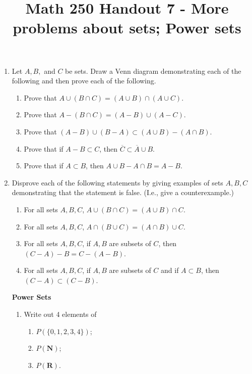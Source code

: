 \documentclass[12pt, reqno]{amsart}
\begin{document}
\title[Math 250 Handout 7 - More problems about sets; Power sets]{Math 250 Handout 7 - More problems about sets; Power sets}\maketitle


\begin{enumerate}
\item Let $A,B,$ and $C$ be sets. Draw a Venn diagram demonstrating each of the following and then prove each of the following.



\begin{enumerate}
\item Prove that $A \cup (B \cap C) = (A\cup B) \cap (A \cup C)$.
\item Prove that $A - (B \cap C) = (A - B) \cup (A - C)$.
\item Prove that $(A - B) \cup (B-A) \subset (A \cup B) - (A \cap B)$.
\item Prove that if $A - B \subset C$, then $ \overline{C} \subset \overline{A} \cup B$.
\item Prove that if $A \subset B$, then $A\cup B - A \cap B = A - B$.
\end{enumerate}
\vspace{1cm}

\item Disprove each of the following statements by giving examples of sets
$A,B,C$ demonstrating that the statement is false. (I.e., give a counterexample.)
\begin{enumerate}
\item For all sets $A,B,C$, $A \cup (B \cap C) = (A\cup B) \cap C$.
\item For all sets $A,B,C$, $A \cap (B \cup C) = (A\cap B) \cup C$.
\item For all sets $A,B,C$, if $A,B$ are subsets of $C$, then $(C-A) - B = C-(A-B)$.
\item For all sets $A,B,C$, if $A,B$ are subsets of $C$ and if $A \subset B$, then $(C-A) \subset (C- B)$.
\end{enumerate}

\newpage
\textbf{Power Sets}\\

\begin{enumerate}
\item Write out 4 elements of
 \begin{enumerate}
 \item $P(\{0,1,2,3,4\})$;
 \item $P(\mathbf{N})$;
 \item $P(\mathbf{R})$.\\
 \end{enumerate}
 \vspace{5cm}


\end{enumerate}
\end{enumerate}
\end{document}
